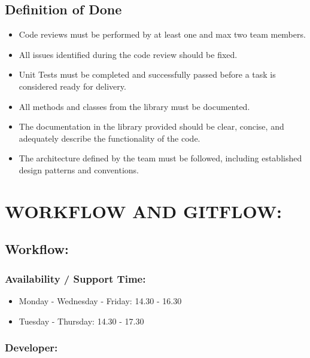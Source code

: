 \documentclass{article}
\providecommand{\tightlist}{
  \setlength{\itemsep}{0pt}\setlength{\parskip}{0pt}}
\begin{document}
\hypertarget{definitionofdone}{
\subsection{\texorpdfstring{\textbf{Definition of
Done}}{Definition of Done}}\label{definitionofdone}}

\begin{itemize}
\tightlist
\item
  Code reviews must be performed by at least one and max two team
  members.
\item
  All issues identified during the code review should be fixed.
\item
  Unit Tests must be completed and successfully passed before a task is
  considered ready for delivery.
\item
  All methods and classes from the library must be documented.
\item
  The documentation in the library provided should be clear, concise, and adequately
  describe the functionality of the code.
\item
  The architecture defined by the team must be followed, including
  established design patterns and conventions.
\end{itemize}

\newpage

\hypertarget{workflow-gitflow}{
\section{WORKFLOW AND GITFLOW:}\label{workflow-gitflow}}

\hypertarget{workflow}{
\subsection{Workflow:}\label{workflow}}

\hypertarget{availabilitysupporttime}{
\subsubsection{Availability / Support
Time:}\label{availabilitysupporttime}}

\begin{itemize}
\tightlist
\item
  Monday - Wednesday - Friday: 14.30 - 16.30
\item
  Tuesday - Thursday: 14.30 - 17.30
\end{itemize}

\hypertarget{developer}{
\subsubsection{Developer:}\label{developer}}
\end{document}
